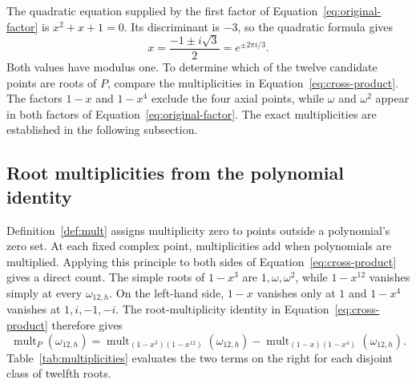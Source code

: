 \documentclass[11pt,a4paper]{article}
\numberwithin{equation}{section}
\theoremstyle{uprightpaper}
\newcommand{\mult}{\operatorname{mult}}
\begin{document}
The quadratic equation supplied by the first factor of Equation~\eqref{eq:original-factor} is $x^2+x+1=0$. Its discriminant is $-3$, so the quadratic formula gives
\begin{equation}\label{eq:firstquadratic}
 x=\frac{-1\pm i\sqrt3}{2}=e^{\pm2\pi i/3}.
\end{equation}
Both values have modulus one. To determine which of the twelve candidate points are roots of $P$, compare the multiplicities in Equation~\eqref{eq:cross-product}. The factors $1-x$ and $1-x^4$ exclude the four axial points, while $\omega$ and $\omega^2$ appear in both factors of Equation~\eqref{eq:original-factor}. The exact multiplicities are established in the following subsection.



\subsection{Root multiplicities from the polynomial identity}\label{subsec:counts}

Definition~\ref{def:mult} assigns multiplicity zero to points outside a polynomial's zero set. At each fixed complex point, multiplicities add when polynomials are multiplied. Applying this principle to both sides of Equation~\eqref{eq:cross-product} gives a direct count. The simple roots of $1-x^3$ are $1,\omega,\omega^2$, while $1-x^{12}$ vanishes simply at every $\omega_{12,h}$. On the left-hand side, $1-x$ vanishes only at $1$ and $1-x^4$ vanishes at $1,i,-1,-i$. The root-multiplicity identity in Equation~\eqref{eq:cross-product} therefore gives
\begin{equation}\label{eq:multiplicity-difference}
 \mult_P(\omega_{12,h})=
 \mult_{(1-x^3)(1-x^{12})}(\omega_{12,h})
 -\mult_{(1-x)(1-x^4)}(\omega_{12,h}).
\end{equation}
Table~\ref{tab:multiplicities} evaluates the two terms on the right for each disjoint class of twelfth roots.
\end{document}
